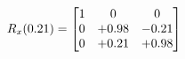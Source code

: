 \documentclass[preview]{standalone}
\begin{document}
\begin{align*}
\special{dvisvgm:raw <g id='unique000'>}R_{x}(0.21) = \begin{bmatrix}1 & 0 & 0 \\0 & +0.98 & -0.21 \\0 & +0.21 & +0.98\end{bmatrix}\special{dvisvgm:raw </g>}
\end{align*}
\end{document}
